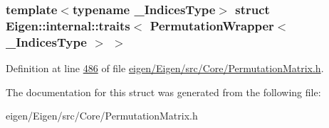 \subsubsection*{template$<$typename \+\_\+\+Indices\+Type$>$\newline
struct Eigen\+::internal\+::traits$<$ Permutation\+Wrapper$<$ \+\_\+\+Indices\+Type $>$ $>$}



Definition at line \hyperlink{eigen_2_eigen_2src_2_core_2_permutation_matrix_8h_source_l00486}{486} of file \hyperlink{eigen_2_eigen_2src_2_core_2_permutation_matrix_8h_source}{eigen/\+Eigen/src/\+Core/\+Permutation\+Matrix.\+h}.



The documentation for this struct was generated from the following file\+:\begin{DoxyCompactItemize}
\item 
eigen/\+Eigen/src/\+Core/\+Permutation\+Matrix.\+h\end{DoxyCompactItemize}
